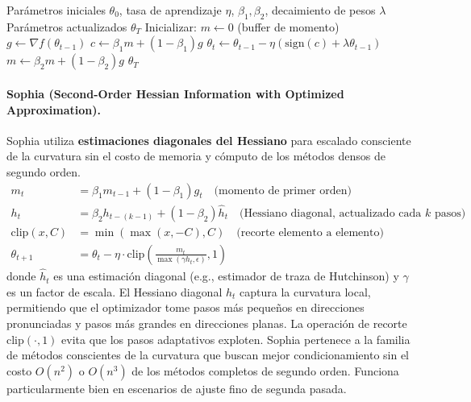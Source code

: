 \begin{algorithm}[H]
\caption{Lion (EvoLved Sign Momentum)}
\label{alg:lion}
\begin{algorithmic}[1]
\Require Parámetros iniciales $\theta_0$, tasa de aprendizaje $\eta$, $\beta_1, \beta_2$, decaimiento de pesos $\lambda$
\Ensure Parámetros actualizados $\theta_T$
\State Inicializar: $m \gets 0$ (buffer de momento)
    \State $g \gets \nabla f(\theta_{t-1})$ 
    \State $c \gets \beta_1 m + (1-\beta_1) g$ 
    \State $\theta_t \gets \theta_{t-1} - \eta (\text{sign}(c) + \lambda \theta_{t-1})$ 
    \State $m \gets \beta_2 m + (1-\beta_2) g$ 
\EndFor
\Return $\theta_T$
\end{algorithmic}
\end{algorithm}

\paragraph{Sophia (Second-Order Hessian Information with Optimized Approximation).}
Sophia utiliza \textbf{estimaciones diagonales del Hessiano} para escalado consciente de la curvatura sin el costo de memoria y cómputo de los métodos densos de segundo orden.\begin{align}
m_t &= \beta_1 m_{t-1} + (1-\beta_1) g_t \quad\text{(momento de primer orden)} \\
h_t &= \beta_2 h_{t-(k-1)} + (1-\beta_2) \hat{h}_t \quad\text{(Hessiano diagonal, actualizado cada $k$ pasos)} \\
\text{clip}(x, C) &= \min(\max(x, -C), C) \quad\text{(recorte elemento a elemento)} \\
\theta_{t+1} &= \theta_t - \eta \cdot \text{clip}\left(\frac{m_t}{\max(\gamma h_t, \epsilon)}, 1\right)
\end{align}
donde $\hat{h}_t$ es una estimación diagonal (e.g., estimador de traza de Hutchinson) y $\gamma$ es un factor de escala. El Hessiano diagonal $h_t$ captura la curvatura local, permitiendo que el optimizador tome pasos más pequeños en direcciones pronunciadas y pasos más grandes en direcciones planas. La operación de recorte $\text{clip}(\cdot, 1)$ evita que los pasos adaptativos exploten. Sophia pertenece a la familia de métodos conscientes de la curvatura que buscan mejor condicionamiento sin el costo $O(n^2)$ o $O(n^3)$ de los métodos completos de segundo orden. Funciona particularmente bien en escenarios de ajuste fino de segunda pasada.

